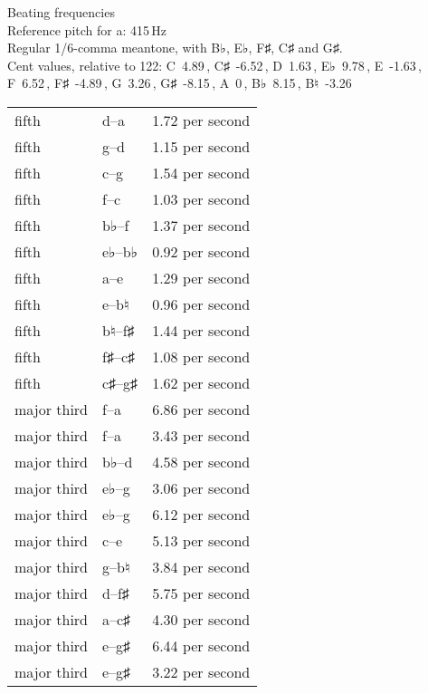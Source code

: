 \documentclass{standalone}
\def\str{\textquotesingle}
\def\cn{\textcent}
\begin{document}
\begin{minipage}{8cm}
\begin{center}
  {\Large Beating frequencies}\\[2ex]
  Reference pitch for a\str: 415\,Hz\\[1ex]
  Regular 1/6-comma meantone, with B♭, E♭, F♯, C♯ and G♯.\\[1ex]
  Cent values, relative to 122: C~4.89\,\cn, C♯~-6.52\,\cn, D~1.63\,\cn, E♭~9.78\,\cn, E~-1.63\,\cn, F~6.52\,\cn, F♯~-4.89\,\cn, G~3.26\,\cn, G♯~-8.15\,\cn, A~0\,\cn, B♭~8.15\,\cn, B♮~-3.26\,\cn
\end{center}
\begin{longtable}{p{2cm}p{1cm}p{3cm}}
  \toprule
  fifth & d\str--a\str & 1.72 per second \\fifth & g--d\str & 1.15 per second \\fifth & c\str--g\str & 1.54 per second \\fifth & f--c\str & 1.03 per second \\fifth & b♭--f\str & 1.37 per second \\fifth & e♭--b♭ & 0.92 per second \\fifth & a--e\str & 1.29 per second \\fifth & e--b♮ & 0.96 per second \\fifth & b♮--f♯\str & 1.44 per second \\fifth & f♯--c♯\str & 1.08 per second \\fifth & c♯\str--g♯\str & 1.62 per second \\major third & f\str--a\str & 6.86 per second \\major third & f--a & 3.43 per second \\major third & b♭--d\str & 4.58 per second \\major third & e♭--g & 3.06 per second \\major third & e♭\str--g\str & 6.12 per second \\major third & c\str--e\str & 5.13 per second \\major third & g--b♮ & 3.84 per second \\major third & d\str--f♯\str & 5.75 per second \\major third & a--c♯\str & 4.30 per second \\major third & e\str--g♯\str & 6.44 per second \\major third & e--g♯ & 3.22 per second \\
  \bottomrule
\end{longtable}
\end{minipage}
\end{document}
